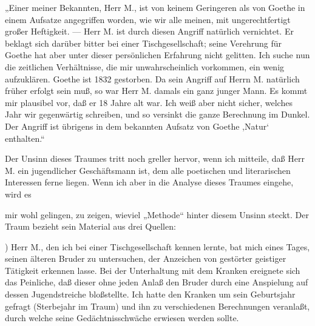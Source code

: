 \documentclass{article}
\begin{document}
            
        \pstart
        „Einer meiner Bekannten, Herr M., ist von keinem Geringeren als
                  von Goethe in einem Aufsatze angegriffen worden, wie wir alle meinen, mit
                  ungerechtfertigt großer Heftigkeit. — Herr M. ist durch diesen Angriff natürlich
                  vernichtet. Er beklagt sich darüber bitter bei einer Tischgesellschaft; seine
                  Verehrung für Goethe hat aber unter dieser persönlichen Erfahrung nicht gelitten.
                  Ich suche nun die zeitlichen Verhältnisse, die mir unwahrscheinlich vorkommen, ein
                  wenig aufzuklären. Goethe ist 1832 gestorben. Da sein Angriff auf Herrn M.
                  natürlich früher erfolgt sein muß, so war Herr M. damals ein ganz junger Mann. Es
                  kommt mir plausibel vor, daß er 18 Jahre alt war. Ich weiß aber nicht sicher,
                  welches Jahr wir gegenwärtig schreiben, und so versinkt die ganze Berechnung im
                  Dunkel. Der Angriff ist übrigens in dem bekannten Aufsatz von Goethe ,Natur‘
                  enthalten.“
        \pend
    
            
        \pstart
        Der Unsinn dieses Traumes tritt noch greller hervor, wenn ich mitteile, daß Herr
               M. ein jugendlicher Geschäftsmann ist, dem alle poetischen und literarischen
               Interessen ferne liegen. Wenn ich aber in die Analyse dieses Traumes eingehe,
               wird es
        \pend
    
         
            
            
            
        \pstart
        mir wohl gelingen, zu zeigen, wieviel „Methode“ hinter diesem Unsinn
               steckt. Der Traum bezieht sein Material aus drei Quellen:
        \pend
    
            
        ) Herr M., den ich bei einer Tischgesellschaft kennen lernte, bat mich eines Tages, seinen älteren
               Bruder zu untersuchen, der Anzeichen von gestörter geistiger Tätigkeit erkennen lasse. Bei der Unterhaltung mit dem Kranken ereignete sich das
               Peinliche, daß dieser ohne jeden Anlaß den Bruder durch eine Anspielung auf
               dessen Jugendstreiche bloßstellte. Ich hatte den Kranken um sein
               Geburtsjahr gefragt (Sterbejahr im Traum) und ihn zu verschiedenen Berechnungen veranlaßt,
               durch welche seine Gedächtnisschwäche erwiesen werden sollte.
        \pend
    
\end{document}
